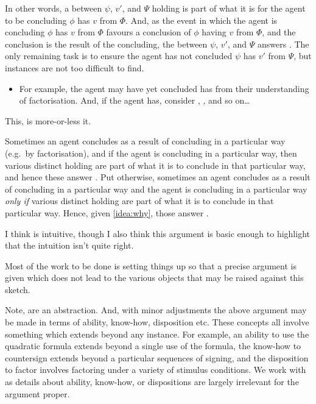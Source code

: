 \begin{note}
\begin{itemize}
  \end{itemize}
  In other words, a \ros{} between \(\psi\), \(v'\), and \(\Psi\) holding is part of what it is for the agent to be concluding \(\phi\) has  \(v\) from \(\Phi\).
  And, as the event in which the agent is concluding \(\phi\) has  \(v\) from \(\Phi\) favours a conclusion of \(\phi\) having  \(v\) from \(\Phi\), and the conclusion is the result of the concluding, the \ros{} between \(\psi\), \(v'\), and \(\Psi\) answers \qWhy{}.
  The only remaining task is to ensure the agent has not concluded \(\psi\) has  \(v'\) from \(\Psi\), but instances are not too difficult to find.
  \begin{itemize}
  \item
    For example, the agent may have yet concluded \propI{\rootsSimp{}} has   from their understanding of factorisation.
    And, if the agent has, consider \propI{\rootsSimpX{}}, \propI{\rootsSimpY{}}, and so on\dots
  \end{itemize}
  This, is more-or-less it.

  Sometimes an agent concludes as a result of concluding in a particular way (e.g.\ by factorisation), and if the agent is concluding in a particular way, then various distinct  holding are part of what it is to conclude in that particular way, and hence these answer \qWhy{}.
  Put otherwise, sometimes an agent concludes as a result of concluding in a particular way and the agent is concluding in a particular way \emph{only if} various distinct  holding are part of what it is to conclude in that particular way.
  Hence, given \autoref{idea:why}, those \ros{} answer \qWhy{}.

  I think \issueInclusion{} is intuitive, though I also think this argument is basic enough to highlight that the intuition isn't quite right.

  Most of the work to be done is setting things up so that a precise argument is given which does not lead to the various objects that may be raised against this sketch.
\end{note}


\begin{note}
  Note,  are an abstraction.
  And, with minor adjustments the above argument may be made in terms of ability, know-how, disposition etc.
  These concepts all involve something which extends beyond any instance.
  For example, an ability to use the quadratic formula extends beyond a single use of the formula, the know-how to countersign extends beyond a particular sequences of signing, and the disposition to factor involves factoring under a variety of stimulus conditions.
  We work with  as details about ability, know-how, or dispositions are largely irrelevant for the argument proper.
\end{note}

